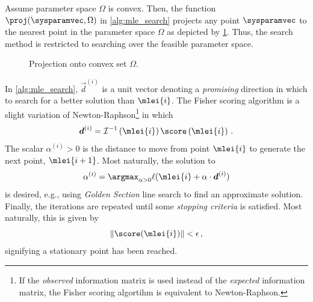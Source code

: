 \documentclass[../main.tex]{subfiles}
\begin{document}
Assume parameter space $\Omega$ is convex. Then, the function $\proj(\sysparamvec, \Omega)$ in \cref{alg:mle_search} projects any point $\sysparamvec$ to the nearest point in the parameter space $\Omega$ as depicted by \cref{fig:convex_proj}. Thus, the search method is restricted to searching over the feasible parameter space.
\begin{figure}
    \caption{Projection onto convex set $\Omega$.}  
    \centering
    \label{fig:convex_proj}
\end{figure}

In \cref{alg:mle_search}, $\vec{d}^{(i)}$ is a unit vector denoting a \emph{promising} direction in which to search for a better solution than $\mlei{i}$. The Fisher scoring algorithm is a slight variation of Newton-Raphson\footnote{If the \emph{observed} information matrix is used instead of the \emph{expected} information matrix, the Fisher scoring algortihm is equivalent to Newton-Raphson.} in which
\begin{equation}
    \vec{d}^{(i)} = \infomatrx^{-1}\left(\mlei{i} \right) \score\left( \mlei{i} \right)\,.
\end{equation}
The scalar $\alpha^{(i)} > 0$ is the distance to move from point $\mlei{i}$ to generate the next point, $\mlei{i+1}$. Most naturally, the solution to
\begin{equation}
    \alpha^{(i)} = \argmax_{\alpha > 0} \ell(\mlei{i} + \alpha \cdot \vec{d}^{(i)})    
\end{equation}
is desired, e.g., using \emph{Golden Section} line search to find an approximate solution. Finally, the iterations are repeated until some \emph{stopping criteria} is satisfied. Most naturally, this is given by
\begin{equation}
    \| \score(\mlei{i}) \| < \epsilon\,,
\end{equation}
signifying a stationary point has been reached.
\end{document}
